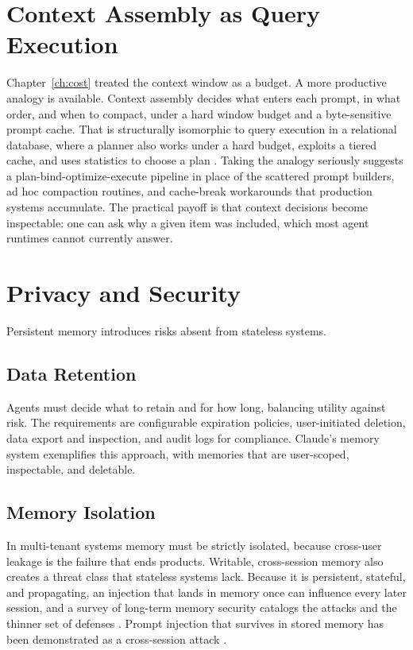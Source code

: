 \documentclass[11pt]{book}
\begin{document}
\section{Context Assembly as Query Execution}

Chapter~\ref{ch:cost} treated the context window as a budget. A more productive analogy is available. Context assembly decides what enters each prompt, in what order, and when to compact, under a hard window budget and a byte-sensitive prompt cache. That is structurally isomorphic to query execution in a relational database, where a planner also works under a hard budget, exploits a tiered cache, and uses statistics to choose a plan \cite{contextpipe2026}. Taking the analogy seriously suggests a plan-bind-optimize-execute pipeline in place of the scattered prompt builders, ad hoc compaction routines, and cache-break workarounds that production systems accumulate. The practical payoff is that context decisions become inspectable: one can ask why a given item was included, which most agent runtimes cannot currently answer.

\section{Privacy and Security}

Persistent memory introduces risks absent from stateless systems.

\subsection{Data Retention}

Agents must decide what to retain and for how long, balancing utility against risk. The requirements are configurable expiration policies, user-initiated deletion, data export and inspection, and audit logs for compliance. Claude's memory system \cite{anthropic2025memory} exemplifies this approach, with memories that are user-scoped, inspectable, and deletable.

\subsection{Memory Isolation}

In multi-tenant systems memory must be strictly isolated, because cross-user leakage is the failure that ends products. Writable, cross-session memory also creates a threat class that stateless systems lack. Because it is persistent, stateful, and propagating, an injection that lands in memory once can influence every later session, and a survey of long-term memory security catalogs the attacks and the thinner set of defenses \cite{memsec2026}. Prompt injection that survives in stored memory has been demonstrated as a cross-session attack \cite{crosssession2026}.
\end{document}
